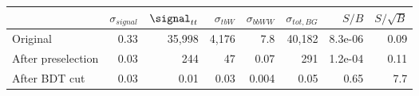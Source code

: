 \begin{tabular}{lrrrrrrr}
\toprule
{} &  $\sigma_{signal}$ &  $\signal_{tt}$ &  $\sigma_{tbW}$ &  $\sigma_{bbWW}$ &  $\sigma_{tot,BG}$ &   $S/B$ &  $S/\sqrt{B}$ \\
\midrule
Original           &               0.33 &          35,998 &           4,176 &              7.8 &             40,182 & 8.3e-06 &          0.09 \\
After preselection &               0.03 &             244 &              47 &             0.07 &                291 & 1.2e-04 &          0.11 \\
After BDT cut      &               0.03 &            0.01 &            0.03 &            0.004 &               0.05 &    0.65 &           7.7 \\
\bottomrule
\end{tabular}
